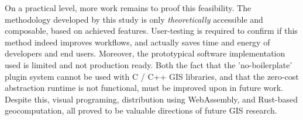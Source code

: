 On a practical level, more work remains to proof this feasibility.
The methodology developed by this study is only \emph{theoretically} accessible and composable, based on achieved features. 
User-testing is required to confirm if this method indeed improves workflows, and actually saves time and energy of developers and end users. 
Moreover, the prototypical software implementation used is limited and not production ready.
Both the fact that the 'no-boilerplate' plugin system cannot be used with C / C++ \ac{GIS} libraries, and that the zero-cost abstraction runtime is not functional, must be improved upon in future work. Despite this, visual programing, distribution using WebAssembly, and Rust-based geocomputation, all proved to be valuable directions of future \ac{GIS} research.






